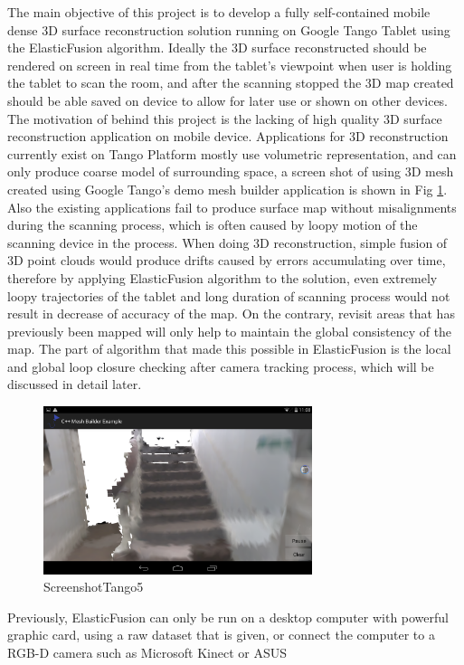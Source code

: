 \documentclass[12pt,twoside]{article}
\begin{document}
The main objective of this project is to develop a fully self-contained mobile dense 3D surface reconstruction solution running on Google Tango Tablet using the ElasticFusion algorithm. Ideally the 3D surface reconstructed should be rendered on screen in real time from the tablet's viewpoint when user is holding the tablet to scan the room, and after the scanning stopped the 3D map created should be able saved on device to allow for later use or shown on other devices. The motivation of behind this project is the lacking of high quality 3D surface reconstruction application on mobile device. Applications for 3D reconstruction currently exist on Tango Platform mostly use volumetric representation, and can only produce coarse model of surrounding space, a screen shot of using 3D mesh created using Google Tango's demo mesh builder application is shown in Fig \ref{fig:ScreenshotTango5}. Also the existing applications fail to produce surface map without misalignments during the scanning process, which is often caused by loopy motion of the scanning device in the process. When doing 3D reconstruction, simple fusion of 3D point clouds would produce drifts caused by errors accumulating over time, therefore by applying ElasticFusion algorithm to the solution, even extremely loopy trajectories of the tablet and long duration of scanning process would not result in decrease of accuracy of the map. On the contrary, revisit areas that has previously been mapped will only help to maintain the global consistency of the map. The part of algorithm that made this possible in ElasticFusion is the local and   global loop closure checking after camera tracking process, which will be discussed in detail later.\\
\begin{figure}[h]
    \centering
    \includegraphics[width=0.7\textwidth]{figures/ScreenshotTango5}
    \caption{ScreenshotTango5}
    \label{fig:ScreenshotTango5}
\end{figure}
Previously, ElasticFusion can only be run on a desktop computer with powerful graphic card, using a raw dataset that is given, or connect the computer to a RGB-D camera such as Microsoft Kinect or ASUS
\end{document}
